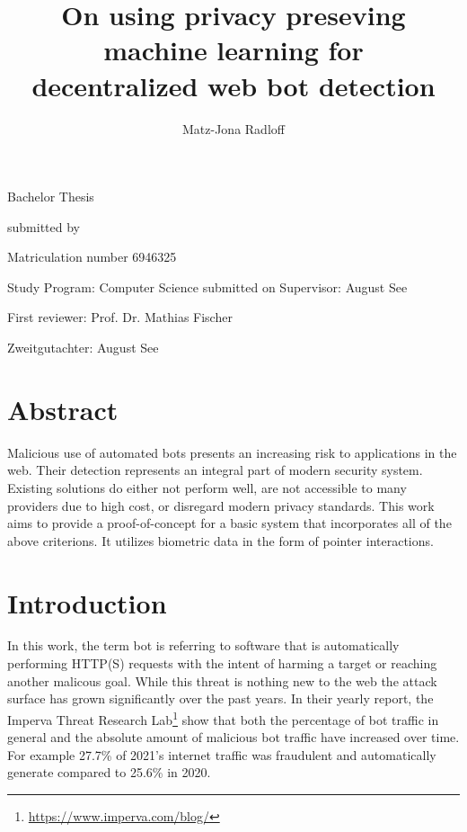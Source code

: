 \documentclass[
    fontsize=12pt,
    headings=small,
    parskip=half,           %
    bibliography=totoc,
    numbers=noenddot,       %
    open=any,               %
    final                   %
]{scrreprt}
\begin{document}
\title{On using privacy preseving machine learning for\\decentralized web bot detection}
\author{Matz-Jona Radloff}


\begin{titlepage}
\begin{center}\Large
	\vfill
    Bachelor Thesis
	\vfill
	\makeatletter
	{\Large\textsf{\textbf{\@title}}\par}
	\makeatother
	\vfill
    submitted by
	\par\bigskip
	\makeatletter
	{\@author} \par
	\makeatother
	Matriculation number 6946325 \par
	Study Program: Computer Science
	\vfill
	\makeatletter
	submitted on {\@date}
	\makeatother
	\vfill
	Supervisor: August See\par
	First reviewer: Prof. Dr. Mathias Fischer \par
	Zweitgutachter: August See
\end{center}
\end{titlepage}


\chapter*{Abstract}

Malicious use of automated bots presents an increasing risk to applications in the web. Their detection represents an integral part of modern security system. Existing solutions do either not perform well, are not accessible to many providers due to high cost, or disregard modern privacy standards. This work aims to provide a proof-of-concept for a basic system that incorporates all of the above criterions. It utilizes biometric data in the form of pointer interactions.

\tableofcontents

\chapter{Introduction}

In this work, the term bot is referring to software that is automatically performing HTTP(S) requests with the intent of harming a target or reaching another malicous goal. While this threat is nothing new to the web the attack surface has grown significantly over the past years. In their yearly report, the Imperva Threat Research Lab\footnote{\url{https://www.imperva.com/blog/}} show that both the percentage of bot traffic in general and the absolute amount of malicious bot traffic have increased over time.\cite{BAD_BOT_REPORT2020,BAD_BOT_REPORT2021,BAD_BOT_REPORT2022} For example 27.7\% of 2021's internet traffic was fraudulent and automatically generate compared to 25.6\% in 2020.
\end{document}
